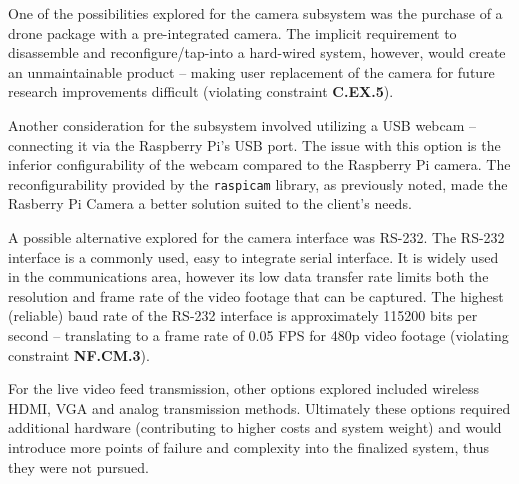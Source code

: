 One of the possibilities explored for the camera subsystem was the purchase of a drone package with a pre-integrated camera. The implicit requirement to disassemble and reconfigure/tap-into a hard-wired system, however, would create an unmaintainable product -- making user replacement of the camera for future research improvements difficult (violating constraint \textbf{C.EX.5}).

Another consideration for the subsystem involved utilizing a USB webcam -- connecting it via the Raspberry Pi's USB port. The issue with this option is the inferior configurability of the webcam compared to the Raspberry Pi camera. The reconfigurability provided by the \texttt{raspicam} library, as previously noted, made the Rasberry Pi Camera a better solution suited to the client's needs.

A possible alternative explored for the camera interface was RS-232. The RS-232 interface is a commonly used, easy to integrate serial interface. It is widely used in the communications area, however its low data transfer rate limits both the resolution and frame rate of the video footage that can be captured. The highest (reliable) baud rate of the RS-232 interface is approximately 115200 bits per second -- translating to a frame rate of 0.05 FPS for 480p video footage (violating constraint \textbf{NF.CM.3}).

For the live video feed transmission, other options explored included wireless HDMI, VGA and analog transmission methods.  Ultimately these options required additional hardware (contributing to higher costs and system weight) and would introduce more points of failure and complexity into the finalized system, thus they were not pursued.
